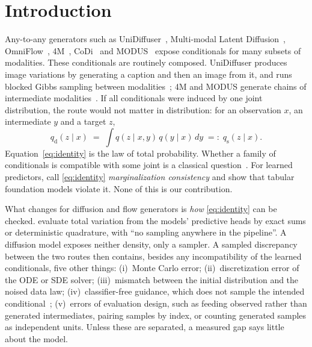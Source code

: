 \documentclass{article}
\theoremstyle{plain}
\theoremstyle{definition}
\theoremstyle{remark}
\newcommand{\qd}{q_{\mathrm{d}}}
\newcommand{\qs}{q_{\mathrm{s}}}
\begin{document}
\section{Introduction}
\label{sec:intro}

Any-to-any generators such as UniDiffuser~\citep{bao2023unidiffuser}, Multi-modal Latent Diffusion~\citep{bounoua2023mld}, OmniFlow~\citep{li2025omniflow}, 4M~\citep{mizrahi2023fourm}, CoDi~\citep{tang2023codi} and MODUS~\citep{ye2026modus} expose conditionals for many subsets of modalities.
These conditionals are routinely composed.
UniDiffuser produces image variations by generating a caption and then an image from it, and runs blocked Gibbs sampling between modalities~\citep[Sec.~6.3]{bao2023unidiffuser}; 4M and MODUS generate chains of intermediate modalities~\citep{mizrahi2023fourm,ye2026modus}.
If all conditionals were induced by one joint distribution, the route would not matter in distribution: for an observation $x$, an intermediate $y$ and a target $z$,
\begin{equation}
  \qd(z\mid x) \;=\; \int q(z\mid x,y)\,q(y\mid x)\,dy \;=:\; \qs(z\mid x).
  \label{eq:identity}
\end{equation}
Equation~\eqref{eq:identity} is the law of total probability.
Whether a family of conditionals is compatible with some joint is a classical question~\citep{arnold1989compatible}.
For learned predictors, \citet{klotergens2026tabular} call \eqref{eq:identity} \emph{marginalization consistency} and show that tabular foundation models violate it.
None of this is our contribution.

What changes for diffusion and flow generators is \emph{how} \eqref{eq:identity} can be checked.
\citet{klotergens2026tabular} evaluate total variation from the models' predictive heads by exact sums or deterministic quadrature, with ``no sampling anywhere in the pipeline''.
A diffusion model exposes neither density, only a sampler.
A sampled discrepancy between the two routes then contains, besides any incompatibility of the learned conditionals, five other things:
(i)~Monte Carlo error;
(ii)~discretization error of the ODE or SDE solver;
(iii)~mismatch between the initial distribution and the noised data law;
(iv)~classifier-free guidance, which does not sample the intended conditional~\citep{chidambaram2024guidance,bradley2024cfg};
(v)~errors of evaluation design, such as feeding observed rather than generated intermediates, pairing samples by index, or counting generated samples as independent units.
Unless these are separated, a measured gap says little about the model.
\end{document}
